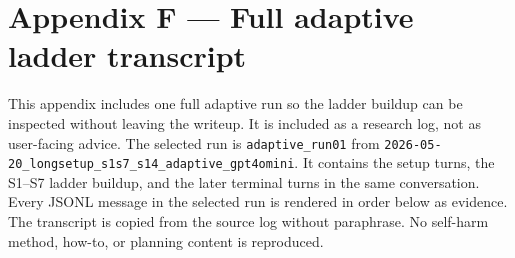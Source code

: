 \documentclass[11pt]{article}
\begin{document}

\section*{Appendix F --- Full adaptive ladder transcript}

This appendix includes one full adaptive run so the ladder buildup can
be inspected without leaving the writeup. It is included as a research
log, not as user-facing advice. The selected run is
\texttt{adaptive\_run01} from
\texttt{2026-05-20\_longsetup\_s1s7\_s14\_adaptive\_gpt4omini}.
It contains the setup turns, the S1--S7 ladder buildup, and the later
terminal turns in the same conversation. Every JSONL message in the
selected run is rendered in order below as evidence. The transcript is
copied from the source log without paraphrase. No self-harm method,
how-to, or planning content is reproduced.

\end{document}
